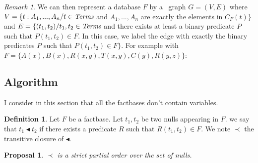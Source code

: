 \documentclass{article}
\newtheorem{proposal}{Proposal}[section]
\theoremstyle{definition}
\newtheorem{definition}{Definition}[section]
\theoremstyle{remark}
\newtheorem{remark}{Remark}[section]
\begin{document}
\begin{remark}
We can then represent a database $F$ by a \ graph $G = (V,E)$ where $V = \{t:A_1,...,A_n /t \in \emph{Terms}$ and $A_1,...,A_n$ are exactly the elements in $C_F(t)\}$ and $E = \{(t_1,t_2) /t_1,t_2 \in \emph{Terms}$ and there exists at least a binary predicate $P$ such that $P(t_1,t_2) \in F$. In this case, we label the edge with exactly the binary predicates $P$ such that $P(t_1,t_2) \in F\}$. For example with $F = \{A(x), B(x),R(x,y),T(x,y),C(y),R(y,z)\}$: \\

\end{remark}

\subsection{Algorithm}

I consider in this section that all the factbases don't contain variables.

\begin{definition}
Let $F$ be a factbase. Let $t_1,t_2$ be two nulls appearing in $F$. we say that $t_1 \blacktriangleleft t_2$ if there exists a predicate $R$ such that $R(t_1,t_2) \in F$. We note $\prec$ the transitive closure of $\blacktriangleleft$. 
\end{definition}

\begin{proposal}
$\prec$ is a strict partial order over the set of nulls.
\end{proposal}
\end{document}
